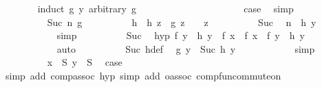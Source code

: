 \begin{isabellebody}
\ \ \ \ \ \ \isamarkupfalse%
\ {\isacharparenleft}{\kern0pt}induct\ {\isachardoublequoteopen}g\ y{\isachardoublequoteclose}\ arbitrary{\isacharcolon}{\kern0pt}\ g{\isacharparenright}{\kern0pt}\isanewline
\ \ \ \ \ \ \ \ \isamarkupfalse%
\ {}\isanewline
\ \ \ \ \ \ \ \ \isamarkupfalse%
\ \isamarkupfalse%
\ {\isacharquery}{\kern0pt}case\ \isamarkupfalse%
\ simp\isanewline
\ \ \ \ \ \ \isamarkupfalse%
\isanewline
\ \ \ \ \ \ \ \ \isamarkupfalse%
\ {\isacharparenleft}{\kern0pt}Suc\ n\ g{\isacharparenright}{\kern0pt}\isanewline
\ \ \ \ \ \ \ \ \isamarkupfalse%
\ h\ \ {\isachardoublequoteopen}h\ z\ {\isacharequal}{\kern0pt}\ g\ z\ {\isacharminus}{\kern0pt}\ {}{\isachardoublequoteclose}\ \ z\isanewline
\ \ \ \ \ \ \ \ \isamarkupfalse%
\ Suc\ \isamarkupfalse%
\ {\isachardoublequoteopen}n\ {\isacharequal}{\kern0pt}\ h\ y{\isachardoublequoteclose}\isanewline
\ \ \ \ \ \ \ \ \ \ \isamarkupfalse%
\ simp\isanewline
\ \ \ \ \ \ \ \ \isamarkupfalse%
\ Suc\ \isamarkupfalse%
\ hyp{\isacharcolon}{\kern0pt}\ {\isachardoublequoteopen}f\ y\ {\isacharcircum}{\kern0pt}{\isacharcircum}{\kern0pt}\ h\ y\ {\isasymcirc}\ f\ x\ {\isacharequal}{\kern0pt}\ f\ x\ {\isasymcirc}\ f\ y\ {\isacharcircum}{\kern0pt}{\isacharcircum}{\kern0pt}\ h\ y{\isachardoublequoteclose}\isanewline
\ \ \ \ \ \ \ \ \ \ \isamarkupfalse%
\ auto\isanewline
\ \ \ \ \ \ \ \ \isamarkupfalse%
\ Suc\ h{\isacharunderscore}{\kern0pt}def\ \isamarkupfalse%
\ {\isachardoublequoteopen}g\ y\ {\isacharequal}{\kern0pt}\ Suc\ {\isacharparenleft}{\kern0pt}h\ y{\isacharparenright}{\kern0pt}{\isachardoublequoteclose}\isanewline
\ \ \ \ \ \ \ \ \ \ \isamarkupfalse%
\ simp\isanewline
\ \ \ \ \ \ \ \ \isamarkupfalse%
\ {\isacartoucheopen}x\ {\isasymin}\ S{\isacartoucheclose}\ {\isacartoucheopen}y\ {\isasymin}\ S{\isacartoucheclose}\ \isamarkupfalse%
\ {\isacharquery}{\kern0pt}case\isanewline
\ \ \ \ \ \ \ \ \ \ \isamarkupfalse%
\ {\isacharparenleft}{\kern0pt}simp\ add{\isacharcolon}{\kern0pt}\ comp{\isacharunderscore}{\kern0pt}assoc\ hyp{\isacharparenright}{\kern0pt}\ {\isacharparenleft}{\kern0pt}simp\ add{\isacharcolon}{\kern0pt}\ o{\isacharunderscore}{\kern0pt}assoc\ comp{\isacharunderscore}{\kern0pt}fun{\isacharunderscore}{\kern0pt}commute{\isacharunderscore}{\kern0pt}on{\isacharparenright}{\kern0pt}\isanewline

\end{isabellebody}
